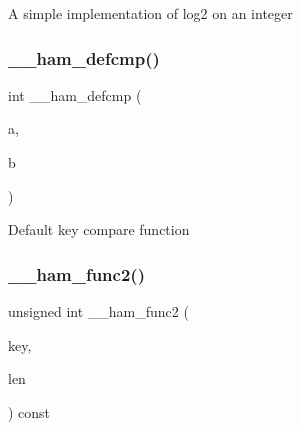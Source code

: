 A simple implementation of log2 on an integer \mbox{\label{adat-devel_2other__libs_2filedb_2filehash_2ffdb__hash__func_8c_a84933d22e6744fb559a08e95010872e6}} 
\subsubsection{\texorpdfstring{\_\_ham\_defcmp()}{\_\_ham\_defcmp()}}
{\footnotesize\ttfamily int \+\_\+\+\_\+ham\+\_\+defcmp (\begin{DoxyParamCaption}\item[{const \mbox{\hyperlink{adat-devel_2other__libs_2filedb_2filehash_2ffdb__db_8h_aa2e0984399491df0fdd20898ca8758f9}{F\+F\+D\+B\+\_\+\+D\+BT}} $\ast$}]{a,  }\item[{const \mbox{\hyperlink{adat-devel_2other__libs_2filedb_2filehash_2ffdb__db_8h_aa2e0984399491df0fdd20898ca8758f9}{F\+F\+D\+B\+\_\+\+D\+BT}} $\ast$}]{b }\end{DoxyParamCaption})}

Default key compare function \mbox{\label{adat-devel_2other__libs_2filedb_2filehash_2ffdb__hash__func_8c_a7baad926e039d464161868b2077d4605}} 
\subsubsection{\texorpdfstring{\_\_ham\_func2()}{\_\_ham\_func2()}}
{\footnotesize\ttfamily unsigned int \+\_\+\+\_\+ham\+\_\+func2 (\begin{DoxyParamCaption}\item[{void $\ast$}]{key,  }\item[{unsigned int}]{len }\end{DoxyParamCaption}) const}

\mbox{\label{adat-devel_2other__libs_2filedb_2filehash_2ffdb__hash__func_8c_a6bd76545445bde60a76f6290b7287d19}} 
